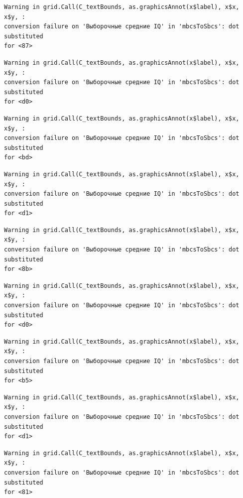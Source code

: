 \documentclass[
  letterpaper,
]{scrbook}
\theoremstyle{definition}
\theoremstyle{remark}
\begin{document}
\begin{verbatim}
Warning in grid.Call(C_textBounds, as.graphicsAnnot(x$label), x$x, x$y, :
conversion failure on 'Выборочные средние IQ' in 'mbcsToSbcs': dot substituted
for <87>
\end{verbatim}

\begin{verbatim}
Warning in grid.Call(C_textBounds, as.graphicsAnnot(x$label), x$x, x$y, :
conversion failure on 'Выборочные средние IQ' in 'mbcsToSbcs': dot substituted
for <d0>
\end{verbatim}

\begin{verbatim}
Warning in grid.Call(C_textBounds, as.graphicsAnnot(x$label), x$x, x$y, :
conversion failure on 'Выборочные средние IQ' in 'mbcsToSbcs': dot substituted
for <bd>
\end{verbatim}

\begin{verbatim}
Warning in grid.Call(C_textBounds, as.graphicsAnnot(x$label), x$x, x$y, :
conversion failure on 'Выборочные средние IQ' in 'mbcsToSbcs': dot substituted
for <d1>
\end{verbatim}

\begin{verbatim}
Warning in grid.Call(C_textBounds, as.graphicsAnnot(x$label), x$x, x$y, :
conversion failure on 'Выборочные средние IQ' in 'mbcsToSbcs': dot substituted
for <8b>
\end{verbatim}

\begin{verbatim}
Warning in grid.Call(C_textBounds, as.graphicsAnnot(x$label), x$x, x$y, :
conversion failure on 'Выборочные средние IQ' in 'mbcsToSbcs': dot substituted
for <d0>
\end{verbatim}

\begin{verbatim}
Warning in grid.Call(C_textBounds, as.graphicsAnnot(x$label), x$x, x$y, :
conversion failure on 'Выборочные средние IQ' in 'mbcsToSbcs': dot substituted
for <b5>
\end{verbatim}

\begin{verbatim}
Warning in grid.Call(C_textBounds, as.graphicsAnnot(x$label), x$x, x$y, :
conversion failure on 'Выборочные средние IQ' in 'mbcsToSbcs': dot substituted
for <d1>
\end{verbatim}

\begin{verbatim}
Warning in grid.Call(C_textBounds, as.graphicsAnnot(x$label), x$x, x$y, :
conversion failure on 'Выборочные средние IQ' in 'mbcsToSbcs': dot substituted
for <81>
\end{verbatim}
\end{document}
